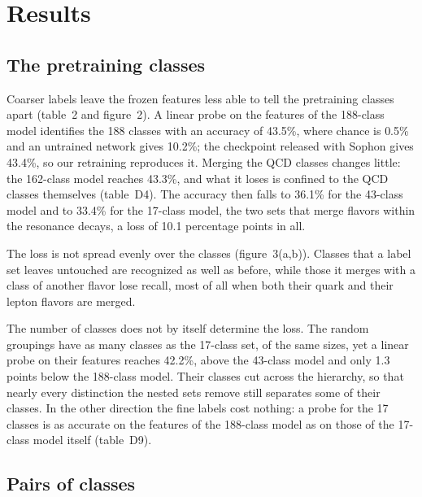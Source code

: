 \documentclass[11pt,a4paper]{article}
\newcommand{\bn}[1]{\textcolor{blue!70!black}{#1}}
\newcommand{\chk}[1]{\textcolor{red!70!black}{#1}}
\begin{document}
\section{Results}

\subsection{The pretraining classes}

Coarser labels leave the frozen features less able to tell the pretraining classes apart
(table~2 and figure~2).
A linear probe on the features of the 188-class model identifies the 188 classes with an accuracy
of \bn{43.5\%}, where chance is \bn{0.5\%} and an untrained network gives \bn{10.2\%}; the
checkpoint released with Sophon gives \bn{43.4\%}, so our retraining reproduces it.
Merging the QCD classes changes little: the 162-class model reaches \bn{43.3\%}, and what it loses
is confined to the QCD classes themselves (table~D4).
The accuracy then falls to \bn{36.1\%} for the 43-class model and to \bn{33.4\%} for the 17-class
model, the two sets that merge flavors within the resonance decays, a loss of \bn{10.1}
percentage points in all.

The loss is not spread evenly over the classes (figure~3(a,b)).
\chk{Classes that a label set leaves untouched are recognized as well as before, while those it
merges with a class of another flavor lose recall, most of all when both their quark and their
lepton flavors are merged.}

The number of classes does not by itself determine the loss.
The random groupings have as many classes as the 17-class set, of the same sizes, yet a linear
probe on their features reaches \bn{42.2\%}, above the 43-class model and only \bn{1.3} points
below the 188-class model.
Their classes cut across the hierarchy, so that nearly every distinction the nested sets remove
still separates some of their classes.
In the other direction the fine labels cost nothing:
\chk{a probe for the 17 classes is as accurate on the features of the 188-class model as on those
of the 17-class model itself (table~D9).}

\subsection{Pairs of classes}
\end{document}
